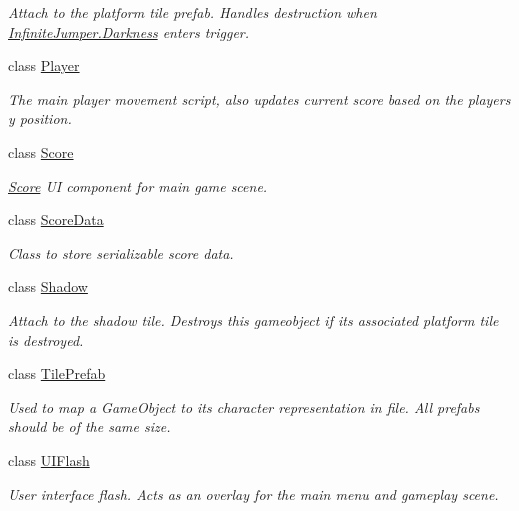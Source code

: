 \begin{DoxyCompactItemize}
\begin{DoxyCompactList}\small\item\em Attach to the platform tile prefab. Handles destruction when \hyperlink{class_infinite_jumper_1_1_darkness}{Infinite\+Jumper.\+Darkness} enters trigger. \end{DoxyCompactList}\item 
class \hyperlink{class_infinite_jumper_1_1_player}{Player}
\begin{DoxyCompactList}\small\item\em The main player movement script, also updates current score based on the players y position. \end{DoxyCompactList}\item 
class \hyperlink{class_infinite_jumper_1_1_score}{Score}
\begin{DoxyCompactList}\small\item\em \hyperlink{class_infinite_jumper_1_1_score}{Score} U\+I component for main game scene. \end{DoxyCompactList}\item 
class \hyperlink{class_infinite_jumper_1_1_score_data}{Score\+Data}
\begin{DoxyCompactList}\small\item\em Class to store serializable score data. \end{DoxyCompactList}\item 
class \hyperlink{class_infinite_jumper_1_1_shadow}{Shadow}
\begin{DoxyCompactList}\small\item\em Attach to the shadow tile. Destroys this gameobject if its associated platform tile is destroyed. \end{DoxyCompactList}\item 
class \hyperlink{class_infinite_jumper_1_1_tile_prefab}{Tile\+Prefab}
\begin{DoxyCompactList}\small\item\em Used to map a Game\+Object to its character representation in file. All prefabs should be of the same size. \end{DoxyCompactList}\item 
class \hyperlink{class_infinite_jumper_1_1_u_i_flash}{U\+I\+Flash}
\begin{DoxyCompactList}\small\item\em User interface flash. Acts as an overlay for the main menu and gameplay scene. \end{DoxyCompactList}\end{DoxyCompactItemize}

